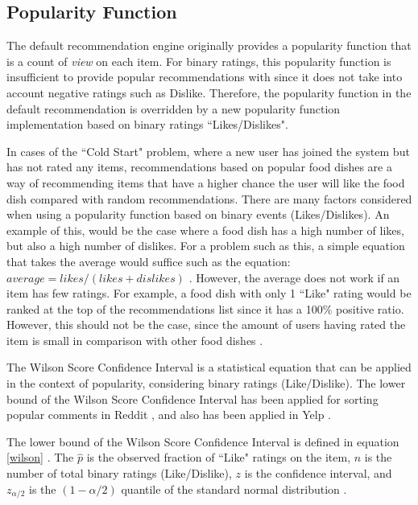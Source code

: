 \subsection{Popularity Function} \label{subsection:popularity}

The default recommendation engine originally provides a popularity function that is a count of \textit{view} on each item. For binary ratings, this popularity function is insufficient to provide popular recommendations with since it does not take into account negative ratings such as Dislike. Therefore, the popularity function in the default recommendation is overridden by a new popularity function implementation based on binary ratings ``Likes/Dislikes". 

In cases of the ``Cold Start" problem, where a new user has joined the system but has not rated any items, recommendations based on popular food dishes are a way of recommending items that have a higher chance the user will like the food dish compared with random recommendations. There are many factors considered when using a popularity function based on binary events (Likes/Dislikes). An example of this, would be the case where a food dish has a high number of likes, but also a high number of dislikes. For a problem such as this, a simple equation that takes the average would suffice such as the equation: $average= likes/(likes+dislikes)$ \cite{popularity}. However, the average does not work if an item has few ratings. For example, a food dish with only 1 ``Like" rating would be ranked at the top of the recommendations list since it has a 100\% positive ratio. However, this should not be the case, since the amount of users having rated the item is small in comparison with other food dishes \cite{popularity}. 

The Wilson Score Confidence Interval \cite{wilson1927probable, popularity} is a statistical equation that can be applied in the context of popularity, considering binary ratings (Like/Dislike). The lower bound of the Wilson Score Confidence Interval has been applied for sorting popular comments in Reddit \cite{reddit}, and also has been applied in Yelp \cite{yelp_pop}.

The lower bound of the Wilson Score Confidence Interval is defined in equation \ref{wilson}  \cite{wilson1927probable, popularity}. The $\hat{p}$ is the observed fraction of ``Like" ratings on the item, $n$ is the number of total binary ratings (Like/Dislike), $z$ is the confidence interval, and $z_{\alpha/2}$ is the $(1-\alpha/2)$ quantile of the standard normal distribution \cite{popularity}.    


